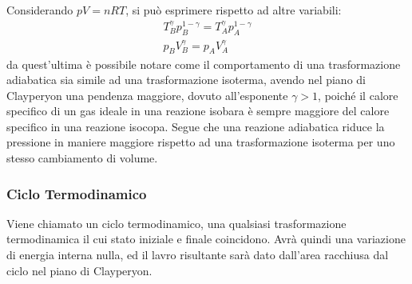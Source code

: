 \documentclass{article}
\numberwithin{equation}{subsection}
\begin{document}
Considerando $pV=nRT$, si può esprimere rispetto ad altre 
variabili:
\begin{gather}
    T_B^{\gamma}p_B^{1-\gamma}=T_A^{\gamma}p_A^{1-\gamma}\\
    p_BV_B^{\gamma}=p_AV_A^{\gamma}
\end{gather}
da quest'ultima è possibile notare come il comportamento di una 
trasformazione adiabatica sia simile ad una trasformazione 
isoterma, avendo nel piano di Clayperyon una pendenza 
maggiore, dovuto all'esponente $\gamma>1$, poiché il calore 
specifico di un gas ideale in una reazione isobara è sempre 
maggiore del calore specifico in una reazione isocopa. Segue che 
una reazione adiabatica riduce la pressione in maniere maggiore 
rispetto ad una trasformazione isoterma per uno stesso 
cambiamento di volume. 
\subsubsection{Ciclo Termodinamico}
Viene chiamato un ciclo termodinamico, una qualsiasi trasformazione 
termodinamica il cui stato iniziale e finale coincidono. Avrà 
quindi una variazione di energia interna nulla, ed il 
lavro risultante sarà dato dall'area racchiusa dal ciclo 
nel piano di Clayperyon. 

\begin{center}\end{center}
\end{document}
